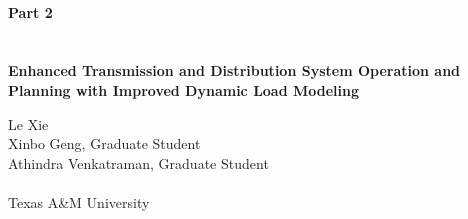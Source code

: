 \documentclass[letterpaper, 12pt, oneside]{book}
\theoremstyle{plain}
\theoremstyle{definition}
\theoremstyle{remark}
\begin{document}


\begin{titlepage}
\centering
\quad \\
\quad \\
\quad \\
\quad \\
\quad \\
\quad \\
\begingroup
    \fontsize{18pt}{20pt}\selectfont
    \textbf{Part 2} \\
    \quad \\
    \quad \\
    \textbf{Enhanced Transmission and Distribution System Operation and Planning with Improved Dynamic Load Modeling}
\endgroup

\vspace{80pt}

\begingroup
\fontsize{16pt}{20pt}\selectfont
Le Xie\\
Xinbo Geng, Graduate Student\\
Athindra Venkatraman, Graduate Student\\
\quad \\
Texas A\&M University    
\endgroup


\end{titlepage}
\end{document}
